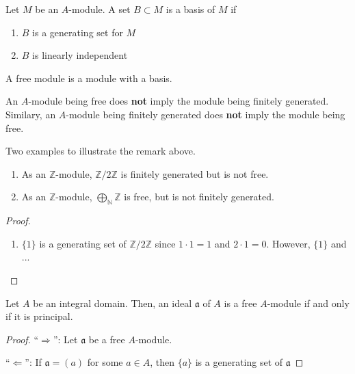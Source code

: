 \begin{defbox}
    \begin{definition}
        Let \(M\) be an \(A\)-module. A set \(B \subset M\) is a basis of \(M\) if
        \begin{enumerate}
            \item \(B\) is a generating set for \(M\)
            \item \(B\) is linearly independent
        \end{enumerate}
        A free module is a module with a basis.
    \end{definition}
\end{defbox}

\begin{rembox}
    \begin{remark}
        An \(A\)-module being free does \textbf{not} imply the module being finitely generated. Similary, an \(A\)-module being finitely generated does \textbf{not} imply the module being free.
    \end{remark}
\end{rembox}

\begin{exmbox}
    \begin{example}
        Two examples to illustrate the remark above.
        \begin{enumerate}
            \item As an \(\mathbb{Z}\)-module, \(\mathbb{Z} / 2 \mathbb{Z}\) is finitely generated but is not free.
            \item As an \(\mathbb{Z}\)-module, \(\bigoplus_{\mathbb{N}} \mathbb{Z}\) is free, but is not finitely generated.
        \end{enumerate}
    \end{example}
\end{exmbox}

\begin{proof}
    \begin{enumerate}
        \item \(\{1\}\) is a generating set of \(\mathbb{Z}/2\mathbb{Z}\) since \(1 \cdot 1 = 1\) and \(2 \cdot 1 = 0\). However, \(\{1\}\) and ...
    \end{enumerate}
\end{proof}

\begin{thmbox}
    \begin{lemma}
        Let \(A\) be an integral domain. Then, an ideal \(\mathfrak{a}\) of \(A\) is a free \(A\)-module if and only if it is principal.
    \end{lemma}
\end{thmbox}
\begin{proof}
    ``\(\Rightarrow\)'': Let \(\mathfrak{a}\) be a free \(A\)-module.

    ``\(\Leftarrow\)'': If \(\mathfrak{a} = (a)\) for some \(a \in A\), then \(\{a\}\) is a generating set of \(\mathfrak{a}\) 
\end{proof}


